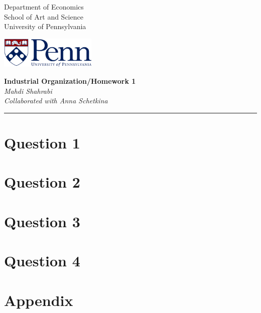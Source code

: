\documentclass[11pt,letterpaper]{article}
\begin{document}
\usetikzlibrary{positioning}
\pagestyle{plain}
\begin{flushleft}
Department of Economics \hfill \\
School of Art and Science\\
University of Pennsylvania
\end{flushleft}

\begin{flushright}\vspace{-2cm}
\includegraphics[height=1.5cm]{HW1/LATEX/Attachments/logo.png}
\end{flushright}
 
\begin{center}\vspace{1cm}
\textbf{\large Industrial Organization/Homework 1}\\   %
\textit{Mahdi Shahrabi} \\\textit{Collaborated with Anna Schetkina}\\                         %

\end{center}
\rule{\linewidth}{0.4mm}

\section{Question 1}


\newpage
\section{Question 2}


\newpage
\section{Question 3}


\newpage
\section{Question 4}


\newpage
\section{Appendix}

\end{document}
